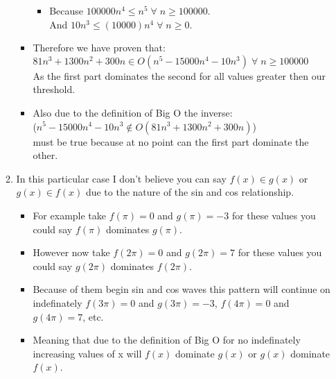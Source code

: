 \documentclass{article}
\begin{document}
\begin{enumerate}
\begin{enumerate}
\begin{itemize}
\begin{itemize}
            \item Because $100000n^4 \leq n^5 \;\forall\; n \geq 100000$. \\
                  And $10n^3 \leq (10000)n^4 \;\forall\; n \geq 0$.
          \end{itemize}
          \item Therefore we have proven that: \\
          $81n^3 + 1300n^2 + 300n \in O(n^5 - 15000n^4 - 10n^3)\;\forall\;n \geq 100000$ \\
          As the first part dominates the second for all values greater then our threshold.
          \item Also due to the definition of Big O the inverse:\\ ($n^5 - 15000n^4 - 10n^3 \notin O(81n^3 + 1300n^2 + 300n)$) \\ must be true because at no point can the first part dominate the other. 
      \end{itemize}
      \item In this particular case I don't believe you can say $f(x) \in g(x)$ or $g(x) \in f(x)$ due to the nature of the sin and cos relationship.
      \begin{itemize}
        \item For example take $f(\pi) = 0$ and $g(\pi) = -3$ for these values you could say $f(\pi)$ dominates $g(\pi)$.
        \item However now take $f(2\pi) = 0$ and $g(2\pi) = 7$ for these values you could say $g(2\pi)$ dominates $f(2\pi)$.
        \item Because of them begin sin and cos waves this pattern will continue on indefinately $f(3\pi) = 0$ and $g(3\pi) = -3$, $f(4\pi) = 0$ and $g(4\pi) = 7$, etc.
        \item Meaning that due to the definition of Big O for no indefinately increasing values of x will $f(x)$ dominate $g(x)$ or $g(x)$ dominate $f(x)$.
      \end{itemize}
    \end{enumerate}


\end{enumerate}
\end{document}
